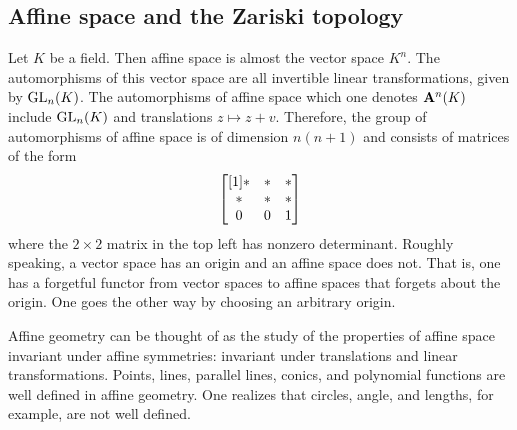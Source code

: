 \documentclass [11 pt, oneside] {article}
\begin{document}
\subsection{Affine space and the Zariski topology}
Let $K$ be a field. Then affine space is almost the vector space $K^n$. The automorphisms of this vector space are all invertible linear transformations, given by $\operatorname{GL}_{n}(K)$. The automorphisms of affine space which one denotes $\mathbf{A}^n(K)$ include $\operatorname{GL}_{n}(K)$ and translations $z \longmapsto z+v$. Therefore, the group of automorphisms of affine space is of dimension $n(n+1)$ and consists of matrices of the form
\begin{align*}
	\begin{bmatrix} [1] *&*&*\\ \text{}*&*&*\\0&0&1\end{bmatrix}
\end{align*}
where the $2\times 2$ matrix in the top left has nonzero determinant. Roughly speaking, a vector space has an origin and an affine space does not. That is, one has a forgetful functor from vector spaces to affine spaces that forgets about the origin. One goes the other way by choosing an arbitrary origin. 

Affine geometry can be thought of as the study of the properties of affine space invariant under affine symmetries: invariant under translations and linear transformations. Points, lines, parallel lines, conics, and polynomial functions are well defined in affine geometry. One realizes that circles, angle, and lengths, for example, are not well defined.
\end{document}
